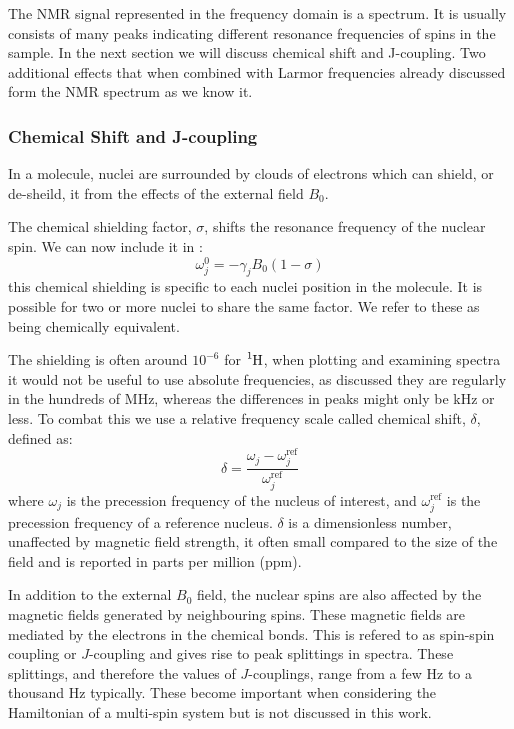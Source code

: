 The NMR signal represented in the frequency domain is a spectrum. It is usually consists of many peaks
indicating different resonance frequencies of spins in the sample. In the next
section we will discuss chemical shift and J-coupling. Two additional effects that when combined
with Larmor frequencies already discussed form the NMR spectrum as we know it.

\subsubsection{Chemical Shift and J-coupling}

In a molecule, nuclei are surrounded by clouds of electrons which can shield, or de-sheild, it
from the effects of the external field $B_0$.

The chemical shielding factor, $\sigma$, shifts the resonance frequency of the nuclear spin. We
can now include it in :
\begin{equation}
  \omega_j^0 = -\gamma_jB_0(1-\sigma)
\end{equation}
this chemical shielding is specific to each nuclei position in the molecule. It is possible
for two or more nuclei to share the same factor. We refer to these as being chemically equivalent.

The shielding is often around $10^{-6}$ for $\ce{^1H}$, when plotting and examining spectra
it would not be useful to use absolute frequencies, as discussed they are regularly in the hundreds of MHz,
whereas the differences in peaks might only be kHz or less. To combat this we use a relative frequency scale
called chemical shift, $\delta$, defined as:
\begin{equation}
  \delta = \frac{\omega_j-\omega^\text{ref}_j}{\omega^\text{ref}_j}
\end{equation}
where $\omega_j$ is the precession frequency of the nucleus of interest, and $\omega^\text{ref}_j$ is the precession
frequency of a reference nucleus. $\delta$ is a dimensionless number, unaffected by magnetic field strength, it often
small compared to the size of the field and is reported in parts per million (ppm).

In addition to the external $B_0$ field, the nuclear spins are also affected by the magnetic fields generated
by neighbouring spins. These magnetic fields are mediated by the electrons in the chemical bonds. This is refered to as
spin-spin coupling or $J$-coupling and gives rise to peak splittings in spectra. These splittings, and therefore the values
of $J$-couplings, range from a few Hz to a thousand Hz typically. These become important when considering the
Hamiltonian of a multi-spin system but is not discussed in this work.

